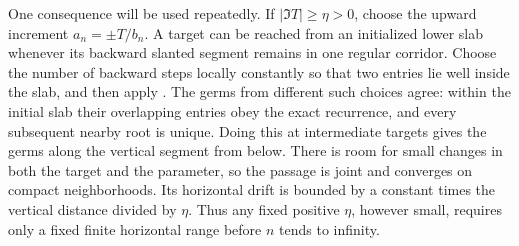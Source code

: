 One consequence will be used repeatedly. If
\(|\Im T|\ge\eta>0\), choose the upward increment
\(a_n=\pm T/b_n\). A target can be reached from an initialized
lower slab whenever its backward slanted segment remains in one
regular corridor. Choose the number of backward steps locally
constantly so that two entries lie well inside the slab, and then
apply . The germs from different such choices
agree: within the initial slab their overlapping entries obey the
exact recurrence, and every subsequent nearby root is unique.
Doing this at intermediate targets gives the germs along the
vertical segment from below. There is room for small changes in both
the target and the parameter, so the passage is joint and converges
on compact neighborhoods. Its horizontal drift is bounded by a
constant times the vertical distance divided by \(\eta\). Thus any
fixed positive \(\eta\), however small, requires only a fixed
finite horizontal range before \(n\) tends to infinity.

